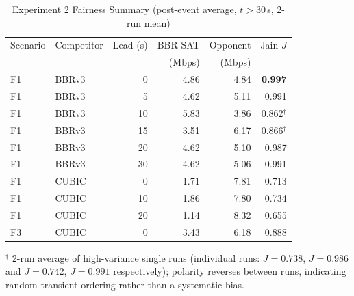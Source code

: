 \begin{table}[t]
\centering
\caption{Experiment 2 Fairness Summary (post-event average, $t > 30$\,s,
         2-run mean)}
\label{tab:exp2}
\small
\begin{tabular}{llrrrr}
\toprule
Scenario & Competitor & Lead (s) & BBR-SAT & Opponent & Jain $J$ \\
         &            &          & (Mbps)  & (Mbps)   &          \\
\midrule
F1 & BBRv3 &  0 & 4.86 & 4.84 & \textbf{0.997} \\
F1 & BBRv3 &  5 & 4.62 & 5.11 & 0.991 \\
F1 & BBRv3 & 10 & 5.83 & 3.86 & 0.862$^\dagger$ \\
F1 & BBRv3 & 15 & 3.51 & 6.17 & 0.866$^\dagger$ \\
F1 & BBRv3 & 20 & 4.62 & 5.10 & 0.987 \\
F1 & BBRv3 & 30 & 4.62 & 5.06 & 0.991 \\
\midrule
F1 & CUBIC  &  0 & 1.71 & 7.81 & 0.713 \\
F1 & CUBIC  & 10 & 1.86 & 7.80 & 0.734 \\
F1 & CUBIC  & 20 & 1.14 & 8.32 & 0.655 \\
\midrule
F3 & CUBIC  &  0 & 3.43 & 6.18 & 0.888 \\
\bottomrule
\end{tabular}
\vspace{2pt}

{\footnotesize $^\dagger$ 2-run average of high-variance single runs
(individual runs: $J = 0.738$, $J = 0.986$ and $J = 0.742$, $J = 0.991$
respectively); polarity reverses between runs, indicating random
transient ordering rather than a systematic bias.}
\end{table}

